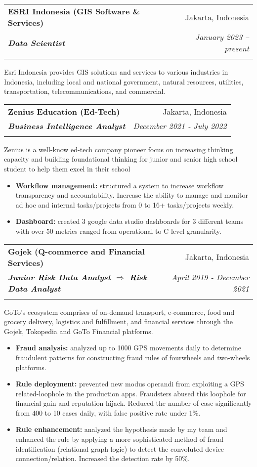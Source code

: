 \documentclass[a4paper, 11pt]{article}
\makeatletter
\newcommand{\resumeItem}[2]{
    \item\small{
        \textbf{#1}{#2 \vspace{-2pt}}
    }
}
\newcommand{\resumeSubheading}[4]{
    \vspace{-1pt}
    \begin{tabular*}{0.97\textwidth}{l@{\extracolsep{\fill}}r}
        \color{lightblue}\textbf{#1} & #2 \\
        \textbf{\textit{\small#3}} & \textit{\small #4} \\
        \textnormal{}\vspace{-5pt}
    \end{tabular*}\vspace{-5pt}
}
\newcommand{\resumeItemListStart}{\begin{itemize}[leftmargin=*]\setlength\itemsep{0em}\vspace{-1pt}}
\newcommand{\resumeItemListEnd}{\end{itemize}\vspace{-5pt}}
\makeatother
\begin{document}
    \resumeSubheading
    {ESRI Indonesia (GIS Software \& Services)}{Jakarta, Indonesia}
    {Data Scientist}{January 2023 – present}
    {Esri Indonesia provides GIS solutions and services to various industries in Indonesia, 
    including local and national government, natural resources, utilities, transportation, telecommunications, and commercial.}
    
    \vspace{5pt}
    \resumeSubheading
    {Zenius Education (Ed-Tech)}
    {Jakarta, Indonesia}
    {Business Intelligence Analyst}
    {December 2021 - July 2022}
    {Zenius is a well-know ed-tech company pioneer focus on increasing thinking capacity and building foundational thinking for junior
    and senior high school student to help them excel in their school}
    \vspace{-5pt}
    \resumeItemListStart
    \resumeItem{Workflow management:}{ structured a system to increase workflow transparency and accountability. 
    Increase the ability to manage and monitor ad hoc and internal tasks/projects from 0 to 16+ tasks/projects weekly.}
    \resumeItem{Dashboard:}{ created 3 google data studio dashboards for 3 different teams with 
    over 50 metrics ranged from operational to C-level granularity.}
    \resumeItemListEnd

    \vspace{5pt}
    \resumeSubheading
    {Gojek (Q-commerce and Financial Services)}
    {Jakarta, Indonesia}
    {Junior Risk Data Analyst $\Rightarrow$ Risk Data Analyst}
    {April 2019 - December 2021}
    {GoTo’s ecosystem comprises of on-demand transport, e-commerce, food and grocery delivery, logistics and fulfillment, and financial
    services through the Gojek, Tokopedia and GoTo Financial platforms.}
    \vspace{-5pt}
    \resumeItemListStart
    \resumeItem{Fraud analysis:}{ analyzed up to 1000 GPS movements daily to determine 
    fraudulent patterns for constructing fraud rules of fourwheels and two-wheels platforms.}
    \resumeItem{Rule deployment:}{ prevented new modus operandi from exploiting a GPS related-loophole in the production apps. 
    Fraudsters abused this loophole for financial gain and reputation hijack. Reduced the number of
    case significantly from 400 to 10 cases daily, with false positive rate under 1\%.}
    \resumeItem{Rule enhancement:}{ analyzed the hypothesis made by my team 
    and enhanced the rule by applying a more sophisticated method of fraud identification (relational graph logic) 
    to detect the convoluted device connection/relation. Increased the detection rate by 50\%.}
    \resumeItemListEnd
\end{document}
